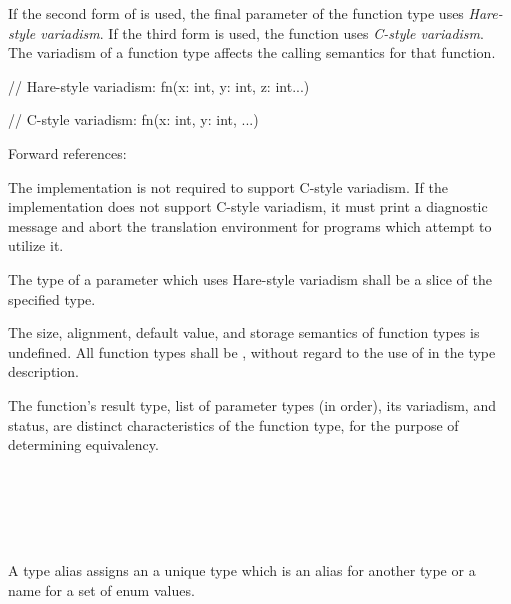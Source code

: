 \specsubsubitem
If the second form of  is used, the final parameter of
the function type uses \textit{Hare-style variadism}. If the third form is
used, the function uses \textit{C-style variadism}. The variadism of a function
type affects the calling semantics for that function.

\begin{codesample}
// Hare-style variadism:
fn(x: int, y: int, z: int...)

// C-style variadism:
fn(x: int, y: int, ...)
\end{codesample}

Forward references: 

\specsubsubitem
The implementation is not required to support C-style variadism. If the
implementation does not support C-style variadism, it must print a diagnostic
message and abort the translation environment for programs which attempt to
utilize it.

\specsubsubitem
The type of a parameter which uses Hare-style variadism shall be a slice of the
specified type.


\specsubsubitem
The size, alignment, default value, and storage semantics of function types is
undefined. All function types shall be , without regard to the
use of  in the type description.

\specsubsubitem
The function's result type, list of parameter types (in order), its variadism,
and  status, are distinct characteristics of the function
type, for the purpose of determining equivalency.


\begin{grammar}
 \\
	 \\

 \\
	  \\
\end{grammar}

\specsubsubitem
A type alias assigns an  a unique type which is an
alias for another type or a name for a set of enum values.

